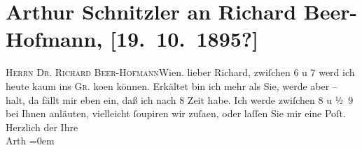 

         
         \renewcommand{\erwaehntePersonen}{Personen: Richard Beer-Hofmann}
         \renewcommand{\erwaehnteOrte}{Orte: Café Griensteidl, Wien}
         \renewcommand{\erwaehnteWerke}{}
               \section[Arthur Schnitzler an Richard Beer-Hofmann, {[}19. 10. 1895?{]}]{ Arthur Schnitzler an Richard Beer-Hofmann, {[}19. 10. 1895?{]}}\nopagebreak{}\rehead{ }\begin{ledgroupsized}[t]{13cm}\normalsize\beginnumbering \toendnotes[C]{\smallbreak\pagebreak[2]} 
\pstart{}{\pb}\textsc{Herrn Dr. Richard
                     Beer-Hofmann}\pend{}\pstart{}Wien.\pend{}{\bigskip}\pstart
           \noindent{}{\pb}lieber Richard, zwiſchen
                  6 u 7 werd ich heute kaum ins \textsc{Gr.} ko{\geminationm}en
               können. Erkältet bin ich mehr als Sie, werde aber – halt, da fällt mir eben ein, daß
               ich nach 8 Zeit habe. Ich werde zwiſchen 8 u
                  ½ 9 bei {\pb}Ihnen anläuten,
               vielleicht ſoupiren wir zuſa{\geminationm}en, oder laſſen Sie mir
               eine Poſt.\pend
           \pstart
           Herzlich der Ihre{\\[\baselineskip]}\spacefill\mbox{Arth}\pend
           \leftskip=0em{}
         
         \endnumbering{}\end{ledgroupsized}  \newcommand{\dateiname}{L00510}\newcommand{\titel}{Arthur Schnitzler an Richard Beer-Hofmann, [19. 10. 1895?]}\newcommand{\editorInnen}{Martin Anton Müller und Gerd-Hermann Susen}
      